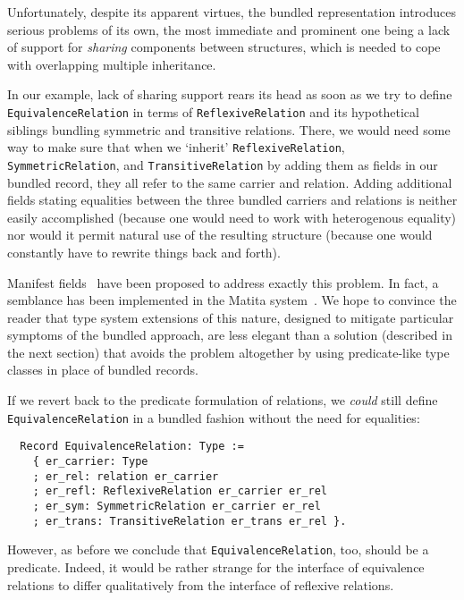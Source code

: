 \documentclass[a4paper,10pt,runningheads]{llncs}
\begin{document}

Unfortunately, despite its apparent virtues, the bundled representation introduces serious problems of its own, the most immediate and prominent one being a lack of support for \emph{sharing} components between structures, which is needed to cope with overlapping multiple inheritance.

In our example, lack of sharing support rears its head as soon as we try to define \lstinline|EquivalenceRelation| in terms of \lstinline|ReflexiveRelation| and its hypothetical siblings bundling symmetric and transitive relations. There, we would need some way to make sure that when we `inherit' \lstinline|ReflexiveRelation|, \lstinline|SymmetricRelation|, and \lstinline|TransitiveRelation| by adding them as fields in our bundled record, they all refer to the same carrier and relation. Adding additional fields stating equalities between the three bundled carriers and relations is neither easily accomplished (because one would need to work with heterogenous equality) nor would it permit natural use of the resulting structure (because one would constantly have to rewrite things back and forth).

Manifest fields~\cite{Pollack:2002} have been proposed to address exactly this problem. In fact, a semblance has been implemented in the Matita system~\cite{sacerdoti2008working}. We hope to convince the reader that type system extensions of this nature, designed to mitigate particular symptoms of the bundled approach, are less elegant than a solution (described in the next section) that avoids the problem altogether by using predicate-like type classes in place of bundled records.

If we revert back to the predicate formulation of relations, we \emph{could} still define \lstinline|EquivalenceRelation| in a bundled fashion without the need for equalities:
\begin{lstlisting}
  Record EquivalenceRelation: Type :=
    { er_carrier: Type
    ; er_rel: relation er_carrier
    ; er_refl: ReflexiveRelation er_carrier er_rel
    ; er_sym: SymmetricRelation er_carrier er_rel
    ; er_trans: TransitiveRelation er_trans er_rel }.
\end{lstlisting}
However, as before we conclude that \mbox{\lstinline|EquivalenceRelation|,} too, should be a predicate. Indeed, it would be rather strange for the interface of equivalence relations to differ qualitatively from the interface of reflexive relations.
\end{document}
